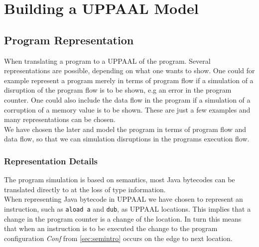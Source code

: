 \chapter{Building a UPPAAL Model}
\section{Program Representation}
When translating a program to a UPPAAL of the program. Several representations are possible, depending on what one wants to show. One could for example represent a program merely in terms of program flow if a simulation of a disruption of the program flow is to be shown, e.g an error in the program counter. One could also include the data flow in the program if a simulation of a corruption of a memory value is to be shown. These are just a few examples and many representations can be chosen.\\

We have chosen the later and model the program in terms of program flow and data flow, so that we can simulation disruptions in the programs execution flow. 


\subsection{Representation Details}
The program simulation is based on \jcl semantics, most Java bytecodes can be translated directly to \jcl at the loss of type information.\\

When representing Java bytecode in UPPAAL we have chosen to represent an instruction, such as \texttt{aload a} and \texttt{dub}, as UPPAAL locations. 
This implies that a change in the program counter is a change of the location. 
In turn this means that when an instruction is to be executed the change to the program configuration \textit{Conf} from  \cref{sec:semintro} occurs on the edge to next location.
